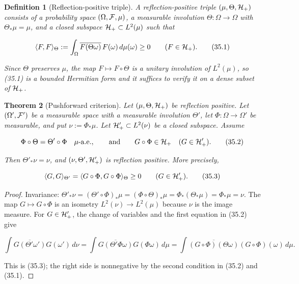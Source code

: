 \documentclass[11pt]{article}
\newtheorem{theorem}{Theorem}[section]
\newtheorem{definition}[theorem]{Definition}
\theoremstyle{remark}
\begin{document}
\begin{definition}[Reflection-positive triple]
\label{def:v19v32-triple}
A reflection-positive triple \((\mu,\Theta,{\cal H}_+)\) consists of a
probability space \((\Omega,{\cal F},\mu)\), a measurable involution
\(\Theta:\Omega\to\Omega\) with \(\Theta_*\mu=\mu\), and a closed
subspace \({\cal H}_+\subset L^2(\mu)\) such that

\[
 \langle F,F\rangle_\Theta
 :=\int_\Omega\overline{F(\Theta\omega)}\,F(\omega)\,d\mu(\omega)
 \geq0\qquad(F\in{\cal H}_+).                                  \tag{35.1}
\]

Since \(\Theta\) preserves \(\mu\), the map \(F\mapsto F\circ\Theta\) is
a unitary involution of \(L^2(\mu)\), so (35.1) is a bounded Hermitian
form and it suffices to verify it on a dense subset of \({\cal H}_+\).
\end{definition}

\begin{theorem}[Pushforward criterion]
\label{thm:v19v32-pushforward}
Let \((\mu,\Theta,{\cal H}_+)\) be reflection positive.  Let
\((\Omega',{\cal F}')\) be a measurable space with a measurable
involution \(\Theta'\), let \(\Phi:\Omega\to\Omega'\) be measurable, and
put \(\nu:=\Phi_*\mu\).  Let \({\cal H}'_+\subset L^2(\nu)\) be a closed
subspace.  Assume

\[
 \Phi\circ\Theta=\Theta'\circ\Phi\quad\mu\hbox{-a.e.},
 \qquad\hbox{and}\qquad
 G\circ\Phi\in{\cal H}_+\quad(G\in{\cal H}'_+).                \tag{35.2}
\]

Then \(\Theta'_*\nu=\nu\), and \((\nu,\Theta',{\cal H}'_+)\) is
reflection positive.  More precisely,

\[
 \langle G,G\rangle_{\Theta'}
 =\langle G\circ\Phi,G\circ\Phi\rangle_\Theta\geq0
 \qquad(G\in{\cal H}'_+).                                       \tag{35.3}
\]
\end{theorem}

\begin{proof}
Invariance: \(\Theta'_*\nu=(\Theta'\circ\Phi)_*\mu
=(\Phi\circ\Theta)_*\mu=\Phi_*(\Theta_*\mu)=\Phi_*\mu=\nu\).
The map \(G\mapsto G\circ\Phi\) is an isometry
\(L^2(\nu)\to L^2(\mu)\) because \(\nu\) is the image measure.  For
\(G\in{\cal H}'_+\), the change of variables and the first equation in
(35.2) give

\[
 \int\overline{G(\Theta'\omega')}G(\omega')\,d\nu
 =\int\overline{G(\Theta'\Phi\omega)}G(\Phi\omega)\,d\mu
 =\int\overline{(G\circ\Phi)(\Theta\omega)}(G\circ\Phi)(\omega)\,d\mu.
\]

This is (35.3); the right side is nonnegative by the second condition
in (35.2) and (35.1).
\end{proof}
\end{document}
